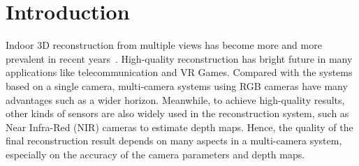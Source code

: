 
\section{Introduction}
Indoor 3D reconstruction from multiple views has become more and more prevalent in recent years~\cite{dou2016fusion4d,orts2016holoportation}. High-quality reconstruction has bright future in many applications like telecommunication and VR Games. Compared with the systems based on a single camera, multi-camera systems using RGB cameras have many advantages such as a wider horizon. Meanwhile, to achieve high-quality results, other kinds of sensors are also widely used in the reconstruction system, such as Near Infra-Red (NIR) cameras to estimate depth maps. Hence, the quality of the final reconstruction result depends on many aspects in a multi-camera system, especially on the accuracy of the camera parameters and depth maps.

